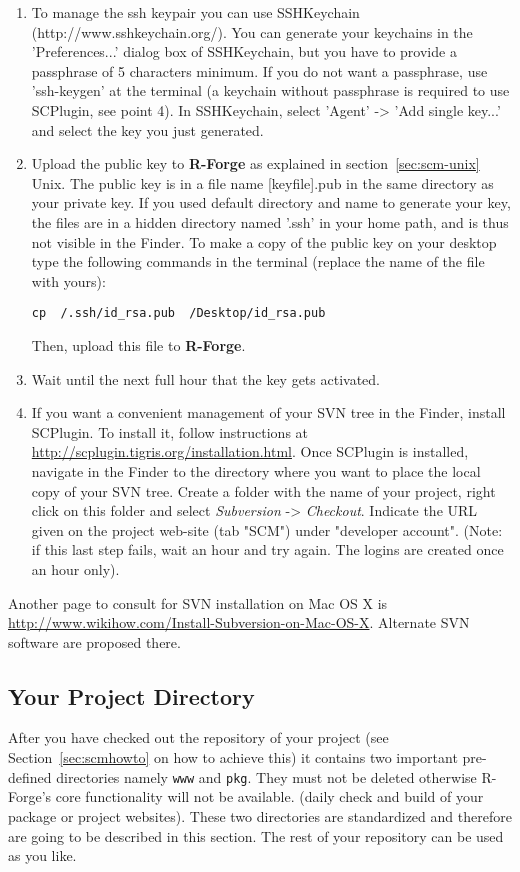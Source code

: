 \documentclass[a4paper]{article}
\let\code\texttt
\begin{document}
\begin{enumerate}
\item To manage the ssh keypair you can use SSHKeychain
(http://www.sshkeychain.org/). You can generate your keychains in the
'Preferences...' dialog box of SSHKeychain, but you have to provide a
passphrase of 5 characters minimum. If you do not want a passphrase,
use 'ssh-keygen' at the terminal (a keychain without passphrase is
required to use SCPlugin, see point 4). In SSHKeychain, select 'Agent'
-> 'Add single key...' and select the key you just generated. 

\item Upload the public key to \textbf{R-Forge} as explained in
  section~\ref{sec:scm-unix}
  Unix. The public key is in a file name [keyfile].pub in the same
  directory as your private key. If you used default directory and
  name to generate your key, the files are in a hidden directory named
  '.ssh' in your home path, and is thus not visible in the Finder. To
  make a copy of the public key on your desktop type the following
  commands in the terminal (replace the name of the file with yours): 

  \code{cp ~/.ssh/id\_rsa.pub ~/Desktop/id\_rsa.pub}
  
  Then, upload this file to \textbf{R-Forge}.

\item Wait until the next full hour that the key gets activated.

\item If you want a convenient management of your SVN tree in the
  Finder, install SCPlugin. To install it, follow instructions at
  \url{http://scplugin.tigris.org/installation.html}. Once SCPlugin is
  installed, navigate in the Finder to the directory where you want to
  place the local copy of your SVN tree. Create a folder with the name
  of your project, right click on this folder and select \textit{Subversion}
  -> \textit{Checkout}. Indicate the URL given on the project web-site (tab
  "SCM") under "developer account". (Note: if this last step fails,
  wait an hour and try again. The logins are created once an hour
  only). 

\end{enumerate}

Another page to consult for SVN installation on Mac OS X is
\url{http://www.wikihow.com/Install-Subversion-on-Mac-OS-X}. Alternate SVN
software are proposed there. 

\subsection{Your Project Directory}
After you have checked out the repository of your project (see
Section~\ref{sec:scmhowto} on how to achieve this) it contains two
important pre-defined directories namely 
\texttt{www} and \texttt{pkg}. They must not be
deleted otherwise R-Forge's core functionality will not be available.
(daily check and build of your package or project websites).
These two
directories are standardized and therefore are going to be described
in this section. The rest of your repository can be used as you like.
\end{document}
